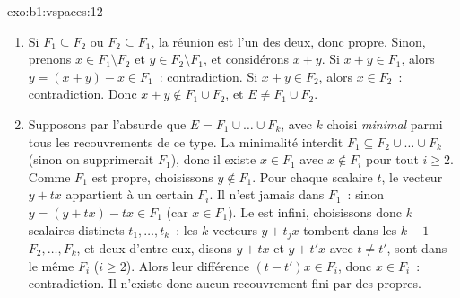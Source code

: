 \begin{solution}{exo:b1:vspaces:12}
\begin{enumerate}
  \item Si $F_1 \subseteq F_2$ ou $F_2 \subseteq F_1$, la réunion
        est l'un des deux, donc propre. Sinon, prenons $x \in F_1
        \setminus F_2$ et $y \in F_2 \setminus F_1$, et considérons
        $x + y$. Si $x + y \in F_1$, alors $y = (x + y) - x \in
        F_1$~: contradiction. Si $x + y \in F_2$, alors $x \in F_2$~:
        contradiction. Donc $x + y \notin F_1 \cup F_2$, et $E \neq
        F_1 \cup F_2$.
  \item Supposons par l'absurde que $E = F_1 \cup \dots \cup
        F_k$, avec $k$ choisi \emph{minimal} parmi tous les
        recouvrements de ce type. La minimalité interdit $F_1 \subseteq
        F_2 \cup \dots \cup F_k$ (sinon on supprimerait $F_1$), donc il
        existe $x \in F_1$ avec $x \notin F_i$ pour tout $i \geq 2$.
        Comme $F_1$ est propre, choisissons $y \notin F_1$. Pour chaque
        scalaire $t$, le vecteur $y + t x$ appartient à un certain
        $F_i$. Il n'est jamais dans $F_1$~: sinon $y = (y + tx) - tx
        \in F_1$ (car $x \in F_1$). Le  est infini, choisissons
        donc $k$ scalaires distincts $t_1, \dots, t_k$~: les $k$
        vecteurs $y + t_j x$ tombent dans les $k - 1$ 
        $F_2, \dots, F_k$, et deux d'entre eux, disons $y + t x$ et $y
        + t' x$ avec $t \neq t'$, sont dans le même $F_i$ ($i \geq 2$).
        Alors leur différence $(t - t')x \in F_i$, donc $x \in F_i$~:
        contradiction. Il n'existe donc aucun recouvrement fini par des
         propres.
\end{enumerate}
\end{solution}

